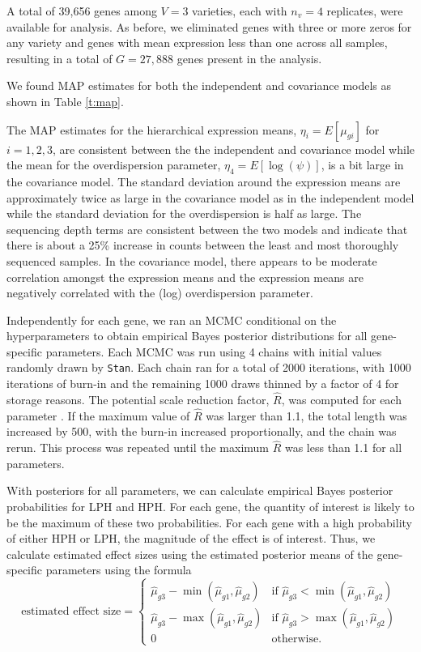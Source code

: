 \documentclass[useAMS,usenatbib,referee]{biom}
\begin{document}
A total of 39,656 genes among $V=3$ varieties, each with $n_v=4$ replicates, were available for analysis. As before, we eliminated genes with three or more zeros for any variety and genes with mean expression less than one across all samples, resulting in a total of $G=27,888$ genes present in the analysis. 

We found MAP estimates for both the independent and covariance models as shown in Table \ref{t:map}. 

The MAP estimates for the hierarchical expression means, $\eta_i = E[\mu_{gi}]$ for $i=1,2,3$, are consistent between the the independent and covariance model while the mean for the overdispersion parameter, $\eta_4=E[\log(\psi)]$, is a bit large in the covariance model. The standard deviation around the expression means are approximately twice as large in the covariance model as in the independent model while the standard deviation for the overdispersion is half as large. The sequencing depth terms are consistent between the two models and indicate that there is about a 25\% increase in counts between the least and most thoroughly sequenced samples. In the covariance model, there appears to be moderate correlation amongst the expression means and the expression means are negatively correlated with the (log) overdispersion parameter.  

Independently for each gene, we ran an MCMC conditional on the hyperparameters to obtain empirical Bayes posterior distributions for all gene-specific parameters. Each MCMC was run using 4 chains with initial values randomly drawn by {\tt Stan}. Each chain ran for a total of 2000 iterations, with 1000 iterations of burn-in and the remaining 1000 draws thinned by a factor of 4 for storage reasons. The potential scale reduction factor, $\hat{R}$, was computed for each parameter \citep{Gelm:Rubi:infe:1992, Broo:Gelm:gene:1997}. If the maximum value of $\hat{R}$ was larger than 1.1, the total length was increased by 500, with the burn-in increased proportionally, and the chain was rerun. This process was repeated until the maximum $\hat{R}$ was less than 1.1 for all parameters.

With posteriors for all parameters, we can calculate empirical Bayes posterior probabilities for LPH and HPH. For each gene, the quantity of interest is likely to be the maximum of these two probabilities. For each gene with a high probability of either HPH or LPH, the magnitude of the effect is of interest. Thus, we calculate estimated effect sizes using the estimated posterior means of the gene-specific parameters using the formula 
\begin{equation}
\mbox{estimated effect size} = \left\{ 
\begin{array}{ll}
\hat{\mu}_{g3} - \min(\hat{\mu}_{g1},\hat{\mu}_{g2}) & \mbox{if } \hat{\mu}_{g3} < \min(\hat{\mu}_{g1},\hat{\mu}_{g2}) \\
\hat{\mu}_{g3} - \max(\hat{\mu}_{g1},\hat{\mu}_{g2}) & \mbox{if } \hat{\mu}_{g3} > \max(\hat{\mu}_{g1},\hat{\mu}_{g2}) \\
0 & \mbox{otherwise}.
\end{array} 
\right. 
\label{e:effect_size}
\end{equation}
\end{document}
